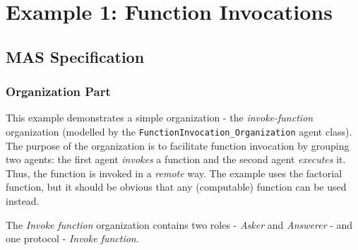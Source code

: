 
\section{Example 1: Function Invocations}

\subsection*{MAS Specification}

\subsubsection*{Organization Part}

This example demonstrates a simple organization - the \textit{invoke-function} organization (modelled by the \texttt{FunctionInvocation\_Organization} agent class).
The purpose of the organization is to facilitate function invocation by grouping two agents: the first agent \textit{invokes} a function and the second agent \textit{executes} it.
Thus, the function is invoked in a \textit{remote} way.
The example uses the factorial function, but it should be obvious that any (computable) function can be used instead.

The \textit{Invoke function} organization contains two roles - \textit{Asker} and \textit{Answerer} - and one protocol - \textit{Invoke function}.

